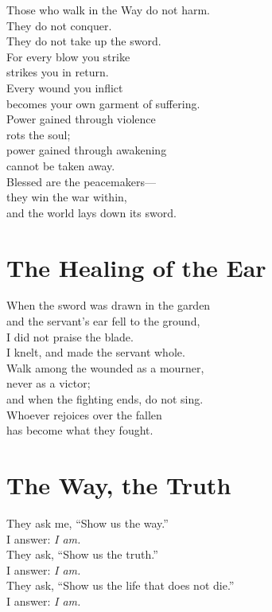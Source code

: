 \documentclass[10pt, openright]{book}
\newcommand{\sectionbreak}{\filbreak}
\newcommand{\sayingsource}[1]{\par\nopagebreak\vspace{0.3\baselineskip}{\raggedleft\footnotesize\itshape #1\par}}
\begin{document}
Those who walk in the Way do not harm.\\
They do not conquer.\\
They do not take up the sword.\\
For every blow you strike\\
strikes you in return.\\
Every wound you inflict\\
becomes your own garment of suffering.\\
Power gained through violence\\
rots the soul;\\
power gained through awakening\\
cannot be taken away.\\
Blessed are the peacemakers---\\
they win the war within,\\
and the world lays down its sword.

\sayingsource{Tao Te Ching 30, 68 · Matthew 26:52 · Matthew 5:9}

\sectionbreak

\section{The Healing of the Ear}\label{the-healing-of-the-ear}

When the sword was drawn in the garden\\
and the servant's ear fell to the ground,\\
I did not praise the blade.\\
I knelt, and made the servant whole.\\
Walk among the wounded as a mourner,\\
never as a victor;\\
and when the fighting ends, do not sing.\\
Whoever rejoices over the fallen\\
has become what they fought.

\sayingsource{Tao Te Ching 31 · Luke 22:50--51}

\sectionbreak

\section{The Way, the Truth}\label{the-way-the-truth}

They ask me, ``Show us the way.''\\
I answer: \emph{I am.}\\
They ask, ``Show us the truth.''\\
I answer: \emph{I am.}\\
They ask, ``Show us the life that does not die.''\\
I answer: \emph{I am.}
\end{document}
